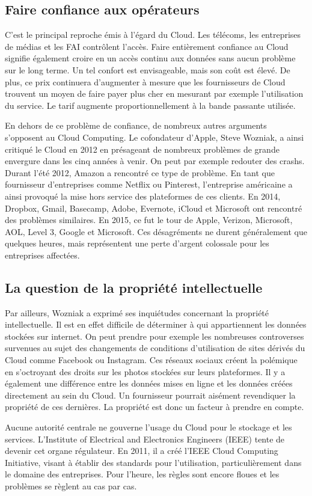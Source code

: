 \subsection*{Faire confiance aux opérateurs}

C’est le principal reproche émis à l’égard du Cloud. Les télécoms, les entreprises de médias et les FAI contrôlent l’accès. Faire entièrement confiance au Cloud signifie également croire en un accès continu aux données sans aucun problème sur le long terme. Un tel confort est envisageable, mais son coût est élevé. De plus, ce prix continuera d’augmenter à mesure que les fournisseurs de Cloud trouvent un moyen de faire payer plus cher en mesurant par exemple l’utilisation du service. Le tarif augmente proportionnellement à la bande passante utilisée.

En dehors de ce problème de confiance, de nombreux autres arguments s’opposent au Cloud Computing. Le cofondateur d’Apple, Steve Wozniak, a ainsi critiqué le Cloud en 2012 en présageant de nombreux problèmes de grande envergure dans les cinq années à venir. On peut par exemple redouter des crashs. Durant l’été 2012, Amazon a rencontré ce type de problème. En tant que fournisseur d’entreprises comme Netflix ou Pinterest, l’entreprise américaine a ainsi provoqué la mise hors service des plateformes de ces clients. En 2014, Dropbox, Gmail, Basecamp, Adobe, Evernote, iCloud et Microsoft ont rencontré des problèmes similaires. En 2015, ce fut le tour de Apple, Verizon, Microsoft, AOL, Level 3, Google et Microsoft. Ces désagréments ne durent généralement que quelques heures, mais représentent une perte d’argent colossale pour les entreprises affectées.

\subsection*{La question de la propriété intellectuelle}
Par ailleurs, Wozniak a exprimé ses inquiétudes concernant la propriété intellectuelle. Il est en effet difficile de déterminer à qui appartiennent les données stockées sur internet. On peut prendre pour exemple les nombreuses controverses survenues au sujet des changements de conditions d’utilisation de sites dérivés du Cloud comme Facebook ou Instagram. Ces réseaux sociaux créent la polémique en s’octroyant des droits sur les photos stockées sur leurs plateformes. Il y a également une différence entre les données mises en ligne et les données créées directement au sein du Cloud. Un fournisseur pourrait aisément revendiquer la propriété de ces dernières. La propriété est donc un facteur à prendre en compte.

Aucune autorité centrale ne gouverne l’usage du Cloud pour le stockage et les services. L’Institute of Electrical and Electronics Engineers (IEEE) tente de devenir cet organe régulateur. En 2011, il a créé l’IEEE Cloud Computing Initiative, visant à établir des standards pour l’utilisation, particulièrement dans le domaine des entreprises. Pour l’heure, les règles sont encore floues et les problèmes se règlent au cas par cas.